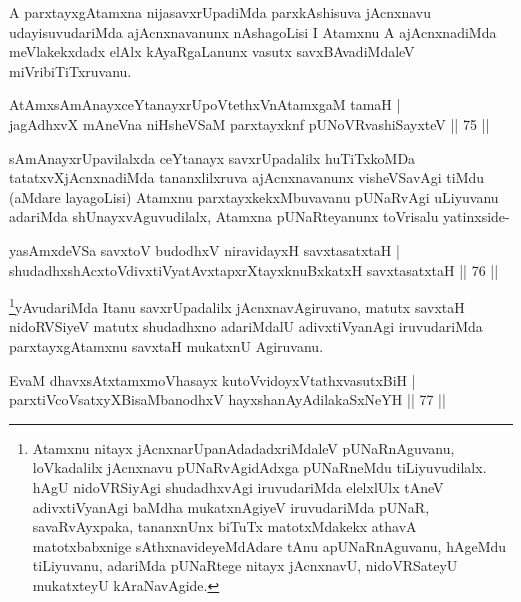 \begin{artha}
A parxtayxgAtamxna nijasavxrUpadiMda parxkAshisuva jAcnxnavu udayisuvudariMda ajAcnxnavanunx nAshagoLisi I Atamxnu A ajAcnxnadiMda meVlakekxdadx elAlx kAyaRgaLanunx vasutx savxBAvadiMdaleV miVribiTiTxruvanu.
\end{artha}


\begin{shl}
AtAmx\s sAmAnayxceYtanayxrUpoVtethxVnA\s \s tamxgaM tamaH |\\
jagAdhxvX mAneVna niHsheVSaM parxtayxknf pUNoVR\s vashiSayxteV \hfill || 75 ||
\end{shl}

\begin{artha}
sAmAnayxrUpavilalxda ceYtanayx savxrUpadalilx huTiTxkoMDa tatatxvXjAcnxnadiMda tananxlilxruva ajAcnxnavanunx visheVSavAgi tiMdu (aMdare layagoLisi) Atamxnu parxtayxkekxMbuvavanu pUNaRvAgi uLiyuvanu adariMda shUnayxvAguvudilalx, Atamxna pUNaRteyanunx toVrisalu yatinxside-
\end{artha}


\begin{shl}
yasAmxdeVSa savxtoV budodhxV niravidayxH savxtasatxtaH |\\
shudadhxshAcxtoV\s divxtiVyatAvxtapxrXtayxknuBxkatxH savxtasatxtaH \hfill || 76 ||
\end{shl}

\begin{artha}
\footnote[1]{Atamxnu nitayx jAcnxnarUpanAdadadxriMdaleV pUNaRnAguvanu, loVkadalilx jAcnxnavu pUNaRvAgidAdxga pUNaRneMdu tiLiyuvudilalx. hAgU nidoVRSiyAgi shudadhxvAgi iruvudariMda elelxlUlx tAneV adivxtiVyanAgi baMdha mukatxnAgiyeV iruvudariMda pUNaR, savaRvAyxpaka, tananxnUnx biTuTx matotxMdakekx athavA matotxbabxnige sAthxnavideyeMdAdare tAnu apUNaRnAguvanu, hAgeMdu tiLiyuvanu, adariMda pUNaRtege nitayx jAcnxnavU, nidoVRSateyU mukatxteyU kAraNavAgide.}yAvudariMda Itanu savxrUpadalilx jAcnxnavAgiruvano, matutx savxtaH nidoRVSiyeV matutx shudadhxno adariMdalU adivxtiVyanAgi iruvudariMda parxtayxgAtamxnu savxtaH mukatxnU Agiruvanu.
\end{artha}%

\begin{shl}
EvaM dhavxsAtxtamxmoVhasayx kutoV\s vidoyxVtathxvasutxBiH |\\
parxtiVcoV\s satxyXBisaMbanodhxV hayxshanAyAdilakaSxNeYH \hfill || 77 ||
\end{shl}

